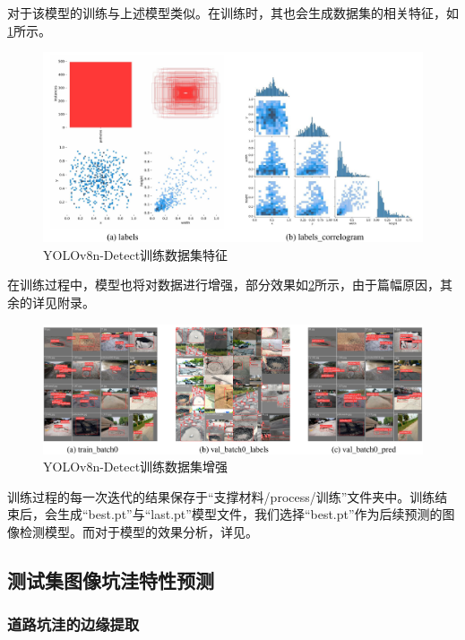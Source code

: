 \documentclass{MathorCupmodeling}
\begin{document}
\begin{itemize}
		对于该模型的训练与上述模型类似。在训练时，其也会生成数据集的相关特征，如\textcolor{blue}{\cref{fig:YOLOv8n-Detect训练数据集特征}}所示。
		\begin{figure}[H]
			\centering
			\includegraphics[scale=0.5]{Figures/detect/DetectLabels.pdf}
			\caption{YOLOv8n-Detect训练数据集特征}
			\label{fig:YOLOv8n-Detect训练数据集特征}
		\end{figure}

		在训练过程中，模型也将对数据进行增强，部分效果如\textcolor{blue}{\cref{fig:YOLOv8n-Detect训练数据集增强}}所示，由于篇幅原因，其余的详见附录。
		\begin{figure}[H]
			\centering
			\includegraphics[scale=0.5]{Figures/detect/Detect训练.pdf}
			\caption{YOLOv8n-Detect训练数据集增强}
			\label{fig:YOLOv8n-Detect训练数据集增强}
		\end{figure}

		训练过程的每一次迭代的结果保存于“支撑材料/process/训练”文件夹中。训练结束后，会生成“best.pt”与“last.pt”模型文件，我们选择“best.pt”作为后续预测的图像检测模型。而对于模型的效果分析，详见\textcolor{blue}{}。
	\end{itemize}
	\subsection{测试集图像坑洼特性预测}
	\subsubsection{道路坑洼的边缘提取}
\end{document}
